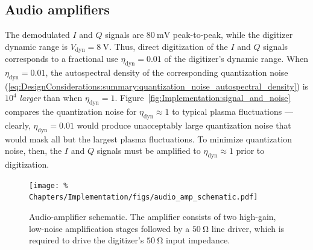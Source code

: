 \subsection{Audio amplifiers}
\label{sec:Implementation:Hardware:audio_amps}
The demodulated $I$ and $Q$ signals are $\SI{80}{\milli\volt}$ peak-to-peak,
while the digitizer dynamic range is $V_{\text{dyn}} = \SI{8}{\volt}$.
Thus, direct digitization of the $I$ and $Q$ signals
corresponds to a fractional use $\eta_{\text{dyn}} = 0.01$
of the digitizer's dynamic range.
When $\eta_{\text{dyn}} = 0.01$,
the autospectral density of the corresponding quantization noise
(\ref{eq:DesignConsiderations:summary:quantization_noise_autospectral_density})
is $10^4$ \emph{larger} than when $\eta_{\text{dyn}} = 1$.
Figure~\ref{fig:Implementation:signal_and_noise}
compares the quantization noise for $\eta_{\text{dyn}} \approx 1$
to typical plasma fluctuations
--- clearly, $\eta_{\text{dyn}} = 0.01$
would produce unacceptably large quantization noise
that would mask all but the largest plasma fluctuations.
To minimize quantization noise, then, the $I$ and $Q$ signals
must be amplified to $\eta_{\text{dyn}} \approx 1$ prior to digitization.

\begin{figure}
  \centering
  \texttt{[image: \%
    Chapters/Implementation/figs/audio\_amp\_schematic.pdf]}
  \caption[Audio-amplifier schematic]{%
    Audio-amplifier schematic.
    The amplifier consists of
    two high-gain, low-noise amplification stages
    followed by a $\SI{50}{\ohm}$ line driver,
    which is required to drive the digitizer's
    $\SI{50}{\ohm}$ input impedance.
  }
\label{fig:Implementation:audio_amplifier_schematic}
\end{figure}

